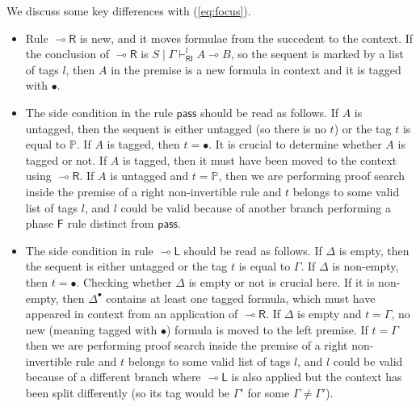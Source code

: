 \documentclass[submission,copyright,creativecommons]{eptcs}
\theoremstyle{definition}
\newcommand{\lright}{{\multimap}\mathsf{R}}
\newcommand{\lleft}{{\multimap}\mathsf{L}}
\newcommand{\pass}{\mathsf{pass}}
\newcommand{\lolli}{\multimap}
\newcommand{\RI}{\mathsf{RI}}
\newcommand{\F}{\mathsf{F}}
\newcommand{\tP}{\mathbb{P}}
\newcommand\niccolo[1]{\mbox{}
{\marginpar{\color{red}NV}}
{\sf\noindent\color{red}#1}}%
\begin{document}
We discuss some key differences with (\ref{eq:focus}).
\begin{itemize}
\item Rule $\lright$ is new, and it moves formulae from the succedent to the context. If the conclusion of $\lright$ is $S \mid \Gamma \vdash^{l}_{\RI} A \lolli B$, so the sequent is marked by a list of tags $l$, then $A$ in the premise is a new formula in context and it is tagged with $\bullet$.
\item The side condition in the rule $\pass$ should be read as follows.
If $A$ is untagged, then the sequent is either untagged (so there is no $t$) or the tag $t$ is equal to $\tP$.
If $A$ is tagged, then $t = \bullet$.
It is crucial to determine whether $A$ is tagged or not.
If $A$ is tagged, then it must have been moved to the context using $\lright$.
If $A$ is untagged and $t = \tP$, then we are performing proof search inside the premise of a right non-invertible rule and $t$ belongs to some valid list of tags $l$, and $l$ could be valid because of another branch performing a phase $\F$ rule distinct from $\pass$.
\item The side condition in rule $\lleft$ should be read as follows. If $\Delta$ is empty, then the sequent is either untagged or the tag $t$ is equal to $ \Gamma$. If $\Delta$ is non-empty, then $t = \bullet$.
Checking whether $\Delta$ is empty or not is crucial here. If it is non-empty, then $\Delta^\bullet$ contains at least one tagged formula, which must have appeared in context from an application of $\lright$. If $\Delta$ is empty and $t = \Gamma$, no new (meaning tagged with $\bullet$) formula is moved to the left premise. If $t = \Gamma$ then we are performing proof search inside the premise of a right non-invertible rule and $t$ belongs to some valid list of tags $l$, and $l$ could be valid because of a different branch where $\lleft$ is also applied but the context has been split differently (so its tag would be $ \Gamma'$ for some $\Gamma \not= \Gamma'$).
\end{itemize}
\end{document}
